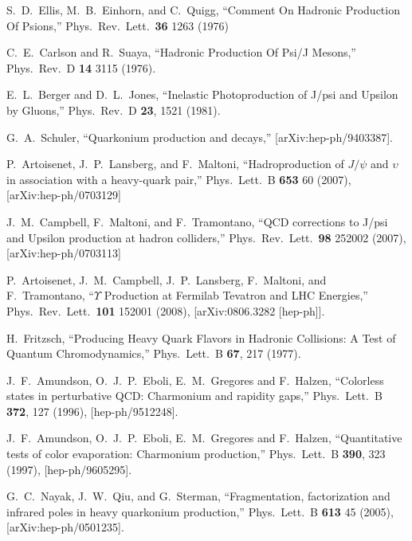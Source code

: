 \documentclass[aps,prc,preprint,superscriptaddress,showpacs,showkeys,amsmath]{revtex4-1}
\begin{document}
\begin{thebibliography}{100}
  S.~D.~Ellis, M.~B.~Einhorn, and C.~Quigg,
  ``Comment On Hadronic Production Of Psions,''
  Phys.\ Rev.\ Lett.\  {\bf 36} 1263 (1976)


  C.~E.~Carlson and R.~Suaya,
  ``Hadronic Production Of Psi/J Mesons,''
  Phys.\ Rev.\  D {\bf 14} 3115 (1976).
  

  E.~L.~Berger and D.~L.~Jones,
  ``Inelastic Photoproduction of J/psi and Upsilon by Gluons,''
  Phys.\ Rev.\ D {\bf 23}, 1521 (1981).

  G.~A.~Schuler,        
  ``Quarkonium production and decays,''
  [arXiv:hep-ph/9403387].


  P.~Artoisenet, J.~P.~Lansberg, and F.~Maltoni,
  ``Hadroproduction of $J/\psi$ and $\upsilon$ in association with a
  heavy-quark pair,''
  Phys.\ Lett.\  B {\bf 653} 60 (2007),
  [arXiv:hep-ph/0703129]


  J.~M.~Campbell, F.~Maltoni, and F.~Tramontano,
  ``QCD corrections to J/psi and Upsilon production at hadron colliders,''
  Phys.\ Rev.\ Lett.\  {\bf 98} 252002 (2007),
  [arXiv:hep-ph/0703113]


  P.~Artoisenet, J.~M.~Campbell, J.~P.~Lansberg, F.~Maltoni, and F.~Tramontano,
  ``$\Upsilon$ Production at Fermilab Tevatron and LHC Energies,''
  Phys.\ Rev.\ Lett.\  {\bf 101} 152001 (2008),
  [arXiv:0806.3282 [hep-ph]].
  


  H.~Fritzsch,
  ``Producing Heavy Quark Flavors in Hadronic Collisions: A Test of Quantum Chromodynamics,''
  Phys.\ Lett.\ B {\bf 67}, 217 (1977).
  
  J.~F.~Amundson, O.~J.~P.~Eboli, E.~M.~Gregores and F.~Halzen,
  ``Colorless states in perturbative QCD: Charmonium and rapidity gaps,''
  Phys.\ Lett.\ B {\bf 372}, 127 (1996),
  [hep-ph/9512248].


  J.~F.~Amundson, O.~J.~P.~Eboli, E.~M.~Gregores and F.~Halzen,
  ``Quantitative tests of color evaporation: Charmonium production,''
  Phys.\ Lett.\ B {\bf 390}, 323 (1997),
  [hep-ph/9605295].


  G.~C.~Nayak, J.~W.~Qiu, and G.~Sterman,
  ``Fragmentation, factorization and infrared poles in heavy quarkonium
  production,''                                                        
  Phys.\ Lett.\  B {\bf 613} 45 (2005),
  [arXiv:hep-ph/0501235].


\end{thebibliography}
\end{document}
